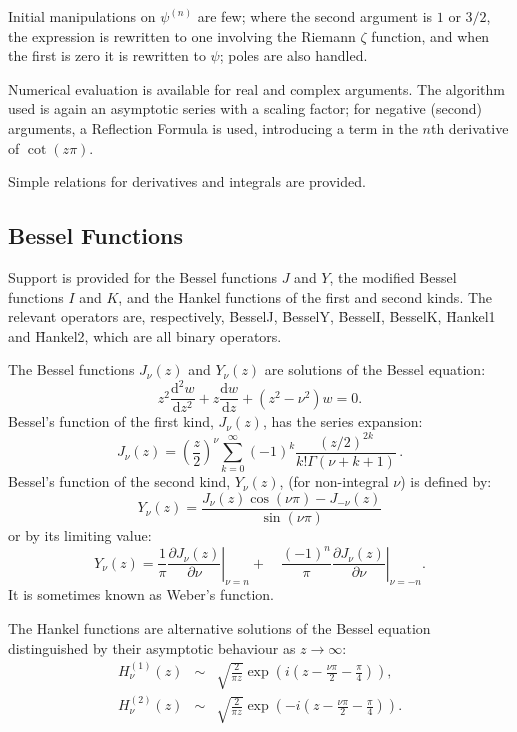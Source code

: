 Initial manipulations on $\psi^{(n)}$ are few; where the second argument
is $1$ or $3/2$, the expression is rewritten to one involving the
Riemann $\zeta$ function, and when the first is zero it is rewritten to
$\psi$; poles are also handled.

Numerical evaluation is available for real and complex arguments. The
algorithm used is again an asymptotic series with a scaling factor; for
negative (second) arguments, a Reflection Formula is used, introducing a
term in the $n$th derivative of $\cot(z\pi)$.

Simple relations for derivatives and integrals are provided.

\subsection{Bessel Functions}
\hypertarget{operator:BESSELI}{}
\hypertarget{operator:BESSELJ}{}
\hypertarget{operator:BESSELK}{}
\hypertarget{operator:BESSELY}{}
\hypertarget{operator:HANKEL1}{}
\hypertarget{operator:HANKEL2}{}
\hypertarget{BESSELF}{}

Support is provided for the Bessel functions $J$ and $Y$, the modified
Bessel functions $I$ and $K$, and the Hankel functions of the first and
second kinds.  The relevant operators are, respectively, \f{BesselJ},
\f{BesselY}, \f{BesselI}, \f{BesselK}, \f{Hankel1} and \f{Hankel2},
which are all binary operators.

The Bessel functions $J_\nu(z)$ and $Y_\nu(z)$ are solutions of the Bessel
equation:
\[z^2\frac{\mathrm{d}^2w}{\mathrm{d}z^2}+z\frac{\mathrm{d}w}{\mathrm{d}z} +
(z^2 - \nu^2)w = 0.\]
Bessel's function of the first kind, $J_\nu(z)$, has the series expansion:
\[J_\nu(z) = \left(\frac{z}{2}\right)^\nu \sum_{k=0}^\infty (-1)^k
\frac{(z/2)^{2k}}{k! \Gamma(\nu + k+1)}\,.\]
Bessel's function of the second kind, $Y_\nu(z)$, (for non-integral $\nu$) is
defined by:
\[Y_\nu(z) = \frac{J_\nu(z) \cos(\nu\pi)-J_{-\nu}(z)}{\sin(\nu\pi)}\]
or by its limiting value:
\[Y_\nu(z) =
\left.\frac{1}{\pi}\frac{\partial{J_\nu(z)}}{\partial\nu}\right|_{\nu=n} +\quad
\left.\frac{(-1)^n}{\pi}\frac{\partial{J_\nu(z)}}{\partial \nu}\right|_{\nu=-n}. \]
It is sometimes known as Weber's function.

The Hankel functions are alternative solutions of the Bessel equation
distinguished by their asymptotic behaviour as $z\rightarrow \infty$:
\begin{eqnarray*}
H_\nu^{(1)}(z) & \sim & \sqrt{\frac{2}{\pi z}}\exp\left(i\left(z-\frac{\nu\pi}
{2}-\frac{\pi}{4}\right)\right),\\
H_\nu^{(2)}(z) & \sim & \sqrt{\frac{2}{\pi z}}\exp\left(-i\left(z-\frac{\nu\pi}
{2}-\frac{\pi}{4}\right)\right).
\end{eqnarray*}


